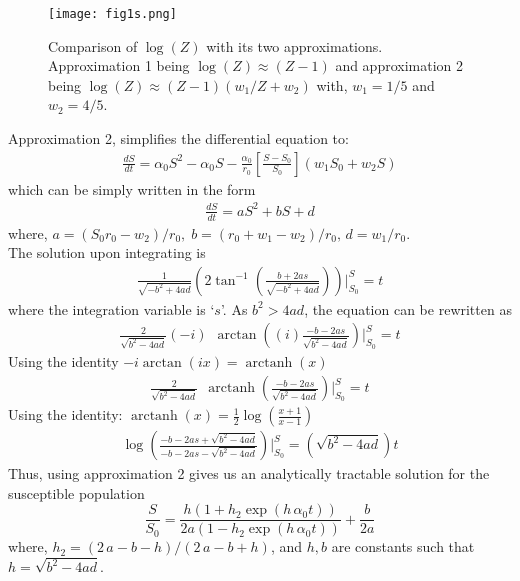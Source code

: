 \documentclass[aps,floatfix,prl,superscriptaddress]{revtex4}
\DeclareMathOperator\arctanh{arctanh}
\begin{document}
\begin{figure}
	\texttt{[image: fig1s.png]}
	\caption{\label{fig1}Comparison of $\log(Z)$ with its two approximations. Approximation 1 being $\log(Z) \approx (Z-1)$ and approximation 2 being $\log(Z) \approx (Z-1)\left(w_1/Z + w_2 \right) $ with, $w_1=1/5$ and $w_2=4/5$.}
\end{figure}
Approximation 2, simplifies the differential equation to:
\begin{align}
\frac{dS}{dt} = \alpha_0 S^2  - \alpha_0 S - \frac{\alpha_0}{r_0} \left[\frac{S-S_0}{S_0}\right]\left(w_1 S_0 + w_2 S\right)
\end{align}
which can be simply written in the form
\begin{align}
\frac{dS}{dt} = a S^2 + bS + d
\end{align}
where, $ a = (S_0 r_0 -  w_2)/ r_0, \; 
b=   \left(r_0 +  w_1-  w_2\right)/r_0, \,  d=  w_1/{r_0}$.
\\
The solution upon integrating is
\begin{align}
\frac{1}{\sqrt{-b^2 + 4ad}} \left( 2 \tan^{-1} \left( \frac{b + 2as}{\sqrt{-b^2 + 4ad}} \right) \right) \Bigg |_{S_{0}}^{S} = t
\end{align}
where the integration variable is `$s$'.
As $b^2>4ad$, the equation can be rewritten as
\begin{align}
\frac{2}{\sqrt{b^2 - 4ad}}(-i) \> \> \arctan \left((i)\frac{-b-2as}{\sqrt{b^2-4ad}} \right) \Bigg |_{S_{0}}^{S} = t 
\end{align}
Using the identity $-i \arctan(ix) = \arctanh (x)$ 
\begin{align}
\frac{2}{\sqrt{b^2-4ad}} \>\> \arctanh \left(\frac{-b-2as}{\sqrt{b^2-4ad}} \right)\Bigg |_{S_{0}}^{S} = t
\end{align}
Using the identity: $\arctanh(x) = \frac{1}{2} \log \left(\frac{x+1}{x-1}\right)$
\begin{align}
\log \left( \frac{-b - 2as + \sqrt{b^2-4ad}}{-b-2as - \sqrt{b^2-4ad}} \right) \Bigg |_{S_{0}}^{S}  = \left( \sqrt{b^2-4ad}\right)t
\end{align}
Thus, using approximation 2 gives us an analytically tractable solution for the susceptible population
\begin{equation}
\frac{S}{S_0} = \frac{h   (1+ h_2 \exp(h \, \alpha_0 t)) }{2a   \left(1-h_2 \exp(h \, \alpha_0 t)\right)}
+\frac{b}{2a}
\end{equation}
where, $h_2 =    (2\, a-b-h)/(2\, a-b+h)$,  and $h,b$ are constants such that $h=\sqrt{b^2-4ad}$. 
  
\end{document}
